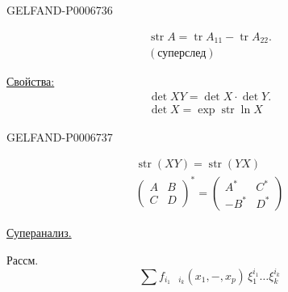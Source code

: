 \begin{GelfandAdjacentEvidence}{GELFAND-P000673}{6}

\[
\begin{gathered}
\operatorname{str}A=\operatorname{tr}A_{11}-\operatorname{tr}A_{22}.\\
(\text{суперслед})
\end{gathered}
\]

\underline{Свойства:}
\[
\begin{gathered}
\det XY=\det X\cdot\det Y.\\
\det X=\exp\operatorname{str}\ln X
\end{gathered}
\]
\end{GelfandAdjacentEvidence}
\begin{GelfandAdjacentEvidence}{GELFAND-P000673}{7}

\[
\begin{gathered}
\operatorname{str}(XY)=\operatorname{str}(YX)\\
\begin{pmatrix}A&B\\ C&D\end{pmatrix}^{*}
=\begin{pmatrix}A^{*}&C^{*}\\ -B^{*}&D^{*}\end{pmatrix}
\end{gathered}
\]

\underline{Суперанализ.}

Рассм.
\[
\sum f_{i_1\quad i_k}(x_1,\mathord{-},x_p)\,
\xi_1^{i_1}\ldots\xi_k^{i_k}
\]
\end{GelfandAdjacentEvidence}
